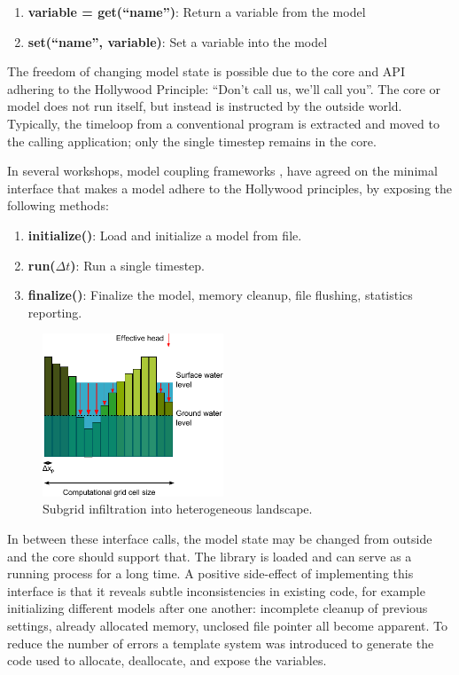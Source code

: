 \documentclass[a4paper]{article}
\begin{document}
\begin{enumerate}
\item \textbf{variable = get(``name'')}: Return a variable from the model
\item \textbf{set(``name'', variable)}: Set a variable into the model
\end{enumerate}

The freedom of changing model state is possible due to the core and \ac{API} adhering to the Hollywood Principle: ``Don't call us, we'll call you''. The core or model does not run itself, but instead is instructed by the outside world. Typically, the timeloop from a conventional program is extracted and moved to the calling application; only the single timestep remains in the core.

In several workshops, model coupling frameworks \citep[see][for an overview]{Jagers2010}, have agreed on the minimal interface that makes a model adhere to the Hollywood principles, by exposing the following methods:

\begin{enumerate}
\item \textbf{initialize()}: Load and initialize a model from file.
\item \textbf{run($\Delta t$)}: Run a single timestep.
\item \textbf{finalize()}: Finalize the model, memory cleanup, file flushing, statistics reporting.
\end{enumerate}

\begin{figure}
\vspace{-30pt}
\centering
\includegraphics[width=0.48\textwidth]{subgrid_hydrology}
\caption{Subgrid infiltration into heterogeneous landscape.}
\label{fig:figure2}
\end{figure}

In between these interface calls, the model state may be changed from outside and the core should support that. The library is loaded and can serve as a running process for a long time. A positive side-effect of implementing this interface is that it reveals subtle inconsistencies in existing code, for example initializing different models after one another: incomplete cleanup of previous settings, already allocated memory, unclosed file pointer all become apparent. To reduce the number of errors a template system was introduced to generate the code used to allocate, deallocate, and expose the variables.
\end{document}
